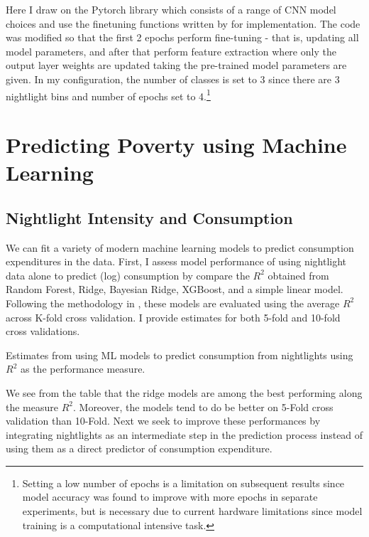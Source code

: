 \documentclass[11pt, a4paper, leqno]{article}
\begin{document}
 Here I draw on the Pytorch library which consists of a range of CNN model choices and use the finetuning functions written by \citet{pytut} for implementation. The code was modified so that the first 2 epochs perform fine-tuning - that is, updating all model parameters, and after that perform feature extraction where only the output layer weights are updated taking the pre-trained model parameters are given. In my configuration, the number of classes is set to 3 since there are 3 nightlight bins and number of epochs set to 4.\footnote{Setting a low number of epochs is a  limitation on subsequent results since model accuracy was found to improve with more epochs in separate experiments, but is necessary due to current hardware limitations since model training is a computational intensive task.}

\section{Predicting Poverty using Machine Learning }

\subsection{Nightlight Intensity and Consumption}

 We can fit a variety of modern machine learning models to predict consumption expenditures in the data. First, I assess model performance of using nightlight data alone to predict (log) consumption by compare the $R^2$ obtained from Random Forest, Ridge, Bayesian Ridge, XGBoost, and a simple linear model. Following the methodology in \citet{jean2016combining}, these models are evaluated using the average $R^2$ across K-fold cross validation. I provide estimates for both 5-fold and 10-fold cross validations.

\begin{table}[H]
\centering
    \scalebox{1.1}{}
\caption{Estimates from using ML models to predict consumption from nightlights using $R^2$ as the performance measure.}
\end{table}

 We see from the table that the ridge models are among the best performing along the measure $R^2$.  Moreover, the models tend to do be better on 5-Fold cross validation than 10-Fold. Next we seek to improve these performances by integrating nightlights as an intermediate step in the prediction process instead of using them as a direct predictor of consumption expenditure. 
\end{document}
